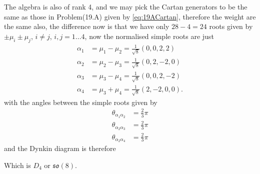 \documentclass[main.tex]{subfiles}
\begin{document}
The algebra is also of rank 4, and we may pick the Cartan generators to be the same as those in Problem(19.A) given by \eqref{eq:19ACartan}, therefore the weight are the same also, the difference now is that we have only $28-4=24$ roots given by $\pm\mu_i\pm\mu_j$, $i\neq j$, $i,j=1...4$, now the normalised simple roots are just
\begin{align}
\alpha_1&=\mu_1-\mu_2=\frac{1}{\sqrt{8}}(0,0,2,2)\\
\alpha_2&=\mu_2-\mu_3=\frac{1}{\sqrt{8}}(0,2,-2,0)\\
\alpha_3&=\mu_3-\mu_4=\frac{1}{\sqrt{8}}(0,0,2,-2)\\
\alpha_4&=\mu_3+\mu_4=\frac{1}{\sqrt{8}}(2,-2,0,0).
\end{align}
with the angles between the simple roots given by
\begin{align}
\theta_{\alpha_1\alpha_2}&=\frac{2}{3}\pi\\
\theta_{\alpha_2\alpha_3}&=\frac{2}{3}\pi\\
\theta_{\alpha_2\alpha_4}&=\frac{2}{3}\pi
\end{align}
and the Dynkin diagram is therefore
\begin{figure}[H] 
\centering
\end{figure}
Which is $D_4$ or $\mathfrak{so}(8)$.
\end{document}
